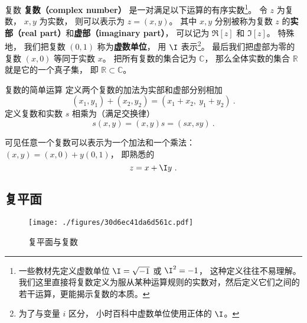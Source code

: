 
\begin{definition}{复数}
\textbf{复数（complex number）} 是一对满足以下运算的有序实数\footnote{一些教材先定义虚数单位 $\I = \sqrt{-1}$ 或 $\I^2 = -1$， 这种定义往往不易理解。 我们这里直接将复数定义为服从某种运算规则的实数对，然后定义它们之间的若干运算，更能揭示复数的本质\cite{Rudin}。}。 令 $z$ 为复数， $x, y$ 为实数， 则可以表示为 $z = (x, y)$。 其中 $x,y$ 分别被称为复数 $z$ 的\textbf{实部（real part）}和\textbf{虚部（imaginary part）}， 可以记为 $\Re[z]$ 和 $\Im[z]$。 特殊地， 我们把复数 $(0, 1)$ 称为\textbf{虚数单位}， 用 $\I$ 表示\footnote{为了与变量 $i$ 区分， 小时百科中虚数单位使用正体的 $\I$。}。 最后我们把虚部为零的复数 $(x, 0)$ 等同于实数 $x$。 把所有复数的集合记为 $\mathbb C$， 那么全体实数的集合 $\mathbb R$ 就是它的一个真子集， 即 $\mathbb R \subset \mathbb C$。
\end{definition}

\begin{definition}{复数的简单运算}
定义两个复数的加法为实部和虚部分别相加
\begin{equation}\label{eq_CplxNo_1}
(x_1, y_1) + (x_2, y_2) = (x_1+ x_2,\ y_1 + y_2)~.
\end{equation}
定义复数和实数 $s$ 相乘为（满足交换律）
\begin{equation}\label{eq_CplxNo_4}
s(x, y) = (x, y)s = (sx, sy)~.
\end{equation}
\end{definition}

可见任意一个复数可以表示为一个加法和一个乘法： $(x, y) = (x, 0) + y(0, 1)$， 即熟悉的
\begin{equation}
z = x + \I y~.
\end{equation}

\subsection{复平面}
\begin{figure}[ht]
\centering
\texttt{[image: ./figures/30d6ec41da6d561c.pdf]}
\caption{复平面与复数} \label{fig_CplxNo_1}
\end{figure}

